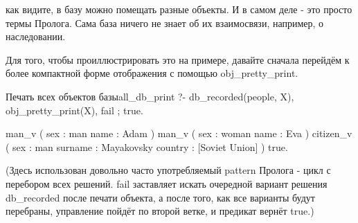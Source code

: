 \documentclass[a4paper]{book}
\def\ur{Uranium}
\begin{document}
как видите, в базу можно помещать разные объекты. И в самом деле
- это просто термы Пролога. Сама база ничего не знает об их
взаимосвязи, например, о наследовании.

Для того, чтобы проиллюстрировать это на примере, давайте сначала
перейдём к более компактной форме отображения с помощью
obj_pretty_print. 

\begin{example}{Печать всех объектов базы}{all_db_print}
?- db_recorded(people, X), 
   obj_pretty_print(X), 
   fail ; true.

man_v ( 
  sex : man 
  name : Adam 
) 
man_v ( 
  sex : woman 
  name : Eva 
) 
citizen_v ( 
  sex : man 
  surname : Mayakovsky 
  country : [Soviet Union] 
) 
true.
\end{example}

(Здесь использован довольно часто употребляемый pattern Пролога -
цикл с перебором всех решений. fail заставляет искать очередной
вариант решения db_recorded после печати объекта, а после того,
как все варианты будут перебраны, управление пойдёт по второй
ветке, и предикат вернёт true.)

\end{document}
